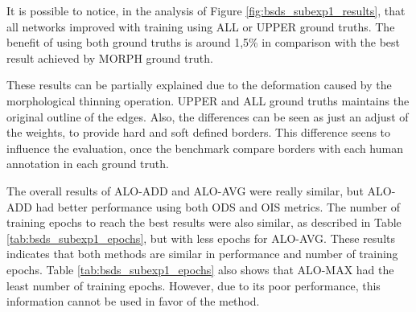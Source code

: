 It is possible to notice, in the analysis of Figure \ref{fig:bsds_subexp1_results}, that all networks improved with training using ALL or UPPER ground truths.
The benefit of using both ground truths is around 1,5\% in comparison with the best result achieved by MORPH ground truth.



These results can be partially explained due to the deformation caused by the morphological thinning operation.
UPPER and ALL ground truths maintains the original outline of the edges.
Also, the differences can be seen as just an adjust of the weights, to provide hard and soft defined borders.
This difference seens to influence the evaluation, once the benchmark compare borders with each human annotation in each ground truth.

The overall results of ALO-ADD and ALO-AVG were really similar, but ALO-ADD had better performance using both ODS and OIS metrics.
The number of training epochs to reach the best results were also similar, as described in Table \ref{tab:bsds_subexp1_epochs}, but with less epochs for ALO-AVG.
These results indicates that both methods are similar in performance and number of training epochs.
Table \ref{tab:bsds_subexp1_epochs} also shows that ALO-MAX had the least number of training epochs.
However, due to its poor performance, this information cannot be used in favor of the method.

